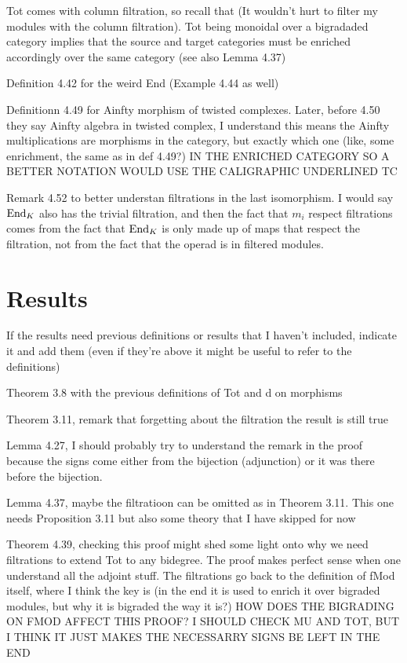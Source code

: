 \documentclass[twoside]{article}
\begin{document}
Tot comes with column filtration, so recall that (It wouldn't hurt to filter my modules with the column filtration).  Tot being monoidal over a bigradaded category implies that the source and target categories must be enriched accordingly over the same category (see also Lemma  4.37)

Definition 4.42 for the weird End (Example 4.44 as well)

Definitionn 4.49 for Ainfty morphism of twisted complexes. Later, before 4.50 they say Ainfty algebra in twisted complex, I understand this means the Ainfty multiplications are morphisms in the category, but exactly which one (like, some enrichment, the same as in def 4.49?) IN THE ENRICHED CATEGORY SO A BETTER NOTATION WOULD USE THE CALIGRAPHIC UNDERLINED TC

Remark 4.52 to better understan filtrations in the last isomorphism. I would say $\operatorname{End}_K$ also has the trivial filtration, and then the fact that $m_i$ respect filtrations  comes from the fact that $\operatorname{End}_K$ is only made up of maps that respect the filtration, not from the fact that the operad is in filtered modules.  

\section{Results}
If the results need previous definitions or results that I haven't included, indicate it and add them (even if they're above it might be useful to refer to the definitions)


Theorem 3.8 with the previous definitions of Tot and d on morphisms

Theorem 3.11, remark that forgetting about the filtration the result is still true

Lemma 4.27, I should probably try to understand  the remark in the proof because the signs come either from the bijection (adjunction) or it was there before the bijection.

Lemma 4.37, maybe the filtratioon can be omitted as in Theorem 3.11. This one needs Proposition 3.11 but also some theory that I have skipped for now

Theorem 4.39, checking this proof might shed some light onto why we need filtrations to extend Tot to any bidegree. The proof makes perfect sense when one understand all the adjoint stuff. The filtrations go back to the definition of fMod itself, where I think the key is (in the end it is used to enrich it over bigraded modules, but why it is bigraded the way it is?) HOW DOES THE BIGRADING ON FMOD AFFECT THIS PROOF? I SHOULD CHECK MU AND TOT, BUT I THINK IT JUST MAKES THE NECESSARRY SIGNS BE LEFT IN THE END
\end{document}
